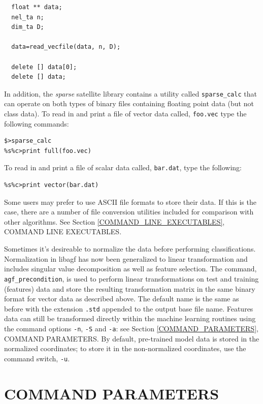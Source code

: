 \documentclass[12pt]{article}
\begin{document}
\begin{verbatim}
  float ** data;
  nel_ta n;
  dim_ta D;

  data=read_vecfile(data, n, D);

  delete [] data[0];
  delete [] data;
\end{verbatim}

In addition, the {\it sparse} satellite library contains a utility called \verb/sparse_calc/ that can operate on both types of binary files containing floating point data (but not class data).  To read in and print a file of vector data called, \verb"foo.vec" type the following commands:

\begin{verbatim}
$>sparse_calc
%s%c>print full(foo.vec)
\end{verbatim}

To read in and print a file of scalar data called, \verb"bar.dat", type the following:

\begin{verbatim}
%s%c>print vector(bar.dat)
\end{verbatim}

Some users may prefer to use ASCII file formats to store their data.  If this is the case, there are a number of file conversion utilities included for comparison with other algorithms.  See Section \ref{COMMAND_LINE_EXECUTABLES}, COMMAND LINE EXECUTABLES.

Sometimes it's desireable to normalize the data before performing classifications.  Normalization in libagf has now been generalized to linear transformation and includes singular value decomposition as well as feature selection.  The command, \verb"agf_precondition", is used to perform linear transformations on test and training (features) data and store the resulting transformation matrix in the same binary format for vector data as described above.  The default name is the same as before with the extension \verb".std" appended to the output base file name.  Features data can still be transformed directly within the machine learning routines using the command options \verb"-n", \verb"-S" and \verb"-a": see Section \ref{COMMAND_PARAMETERS}, COMMAND PARAMETERS.  By default, pre-trained model data is stored in the normalized coordinates; to store it in the non-normalized coordinates, use the command switch, \verb"-u".

\section{COMMAND PARAMETERS}
\end{document}
